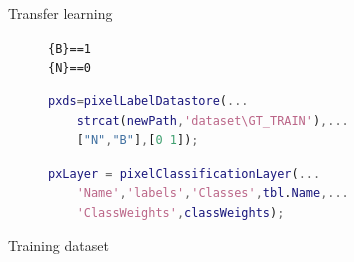 \documentclass[aspectratio=169,xcolor=dvipsnames]{beamer}
\begin{document}
\begin{frame}[fragile]{Transfer learning}

	\begin{figure}
\begin{minipage}{\linewidth}
	\tiny{\def\svgwidth{\linewidth}
		}
\end{minipage}
\vspace{0.03\linewidth}

\begin{minipage}{0.15\linewidth}
	\centering
 \texttt{\{B\}==1}\\
 \texttt{\{N\}==0}

\end{minipage}\hfill
\begin{minipage}{0.4\linewidth}
	\tiny{\begin{lstlisting}[language=Matlab,basicstyle=\tiny]
	pxds=pixelLabelDatastore(...
	strcat(newPath,'dataset\GT_TRAIN'),...
	["N","B"],[0 1]); 
		\end{lstlisting}}
\end{minipage}\hfill
\begin{minipage}{0.4\linewidth}
	\tiny{\begin{lstlisting}[language=Matlab,basicstyle=\tiny]
	pxLayer = pixelClassificationLayer(...
	'Name','labels','Classes',tbl.Name,...
	'ClassWeights',classWeights);
	\end{lstlisting}}
\end{minipage}\hfill
	\end{figure}

	
\end{frame}

\begin{frame}{Training dataset}
	

\begin{figure}
	\begin{minipage}{0.6\linewidth}
		\tiny{\def\svgwidth{\linewidth}
			}
	\end{minipage}\hspace{0.05\linewidth}
	\begin{minipage}{0.3\linewidth}
	\tiny{\def\svgwidth{\linewidth}
		}
\end{minipage}
\end{figure}
\begin{figure}
	\begin{minipage}{\linewidth}
	\tiny{\def\svgwidth{\linewidth}
		}
\end{minipage}
\end{figure}
\end{frame}
\end{document}
